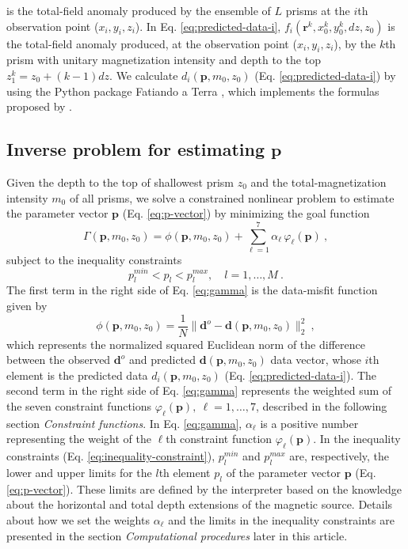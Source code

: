 is the total-field anomaly produced by the ensemble of $L$ prisms at the $i$th observation point ($x_{i}, y_{i}, z_{i}$). In Eq. \ref{eq:predicted-data-i}, $f_{i}(\mathbf{r}^{k}, x_{0}^{k}, y_{0}^{k}, dz, z_{0})$ is the total-field anomaly produced, at the observation point ($x_{i}, y_{i}, z_{i}$), by the $k$th prism with unitary magnetization intensity and depth to the top $z_{1}^{k} = z_{0} + (k-1)dz$. We calculate $d_{i} (\mathbf{p}, m_{0}, z_{0})$ (Eq. \ref{eq:predicted-data-i}) by using the Python package Fatiando a Terra \cite[]{uieda-etal2013}, which implements the formulas proposed by \cite{plouff1976}.

\subsection{Inverse problem for estimating $\mathbf{p}$}

Given the depth to the top of shallowest prism $z_{0}$ and the total-magnetization
intensity $m_{0}$ of all prisms, we solve a constrained nonlinear problem to estimate the parameter vector $\mathbf{p}$ (Eq. \ref{eq:p-vector}) by minimizing 
the goal function
\begin{equation}
\Gamma (\mathbf{p}, m_{0}, z_{0}) = \phi (\mathbf{p}, m_{0}, z_{0}) + 
\sum\limits^{7}_{\ell =1} \alpha_{\ell} \, \varphi_{\ell}(\mathbf{p}) \: ,
\label{eq:gamma}
\end{equation}
subject to the inequality constraints
\begin{equation}
p_{l}^{min} < p_{l} < p_{l}^{max}, \quad l = 1, \dots, M \: .
\label{eq:inequality-constraint}
\end{equation}
The first term in the right side of Eq. \ref{eq:gamma} is the data-misfit 
function given by
\begin{equation}\label{eq:misfit}
\phi (\mathbf{p}, m_{0}, z_{0}) = \frac{1}{N} \| \mathbf{d}^{o} - 
\mathbf{d}(\mathbf{p}, m_{0}, z_{0}) \|_{2}^{2} \: ,
\end{equation}
which represents the normalized squared Euclidean norm of the difference between the 
observed $\mathbf{d}^{o}$ and predicted $\mathbf{d}(\mathbf{p}, m_{0}, z_{0})$ data
vector, whose $i$th element is the predicted data $d_{i} (\mathbf{p}, m_{0}, z_{0})$ 
(Eq. \ref{eq:predicted-data-i}).
The second term in the right side of Eq. \ref{eq:gamma} represents the 
weighted sum of the seven constraint functions $\varphi_{\ell}(\mathbf{p}), \: 
\ell = 1, \dots, 7$, described in the following section \textit{Constraint functions}.
In Eq. \ref{eq:gamma}, $\alpha_{\ell}$ is a positive number representing 
the weight of the $\ell$th constraint function $\varphi_{\ell}(\mathbf{p})$.
In the inequality constraints (Eq. \ref{eq:inequality-constraint}), 
$p_{l}^{min}$ and $p_{l}^{max}$ are, respectively, the lower and upper limits for 
the $l$th element $p_{l}$ of the parameter vector $\mathbf{p}$ 
(Eq. \ref{eq:p-vector}). 
These limits are defined by the interpreter based on the knowledge about the 
horizontal and total depth extensions of the magnetic source. 
Details about how we set the weights $\alpha_{\ell}$ and the limits in the
inequality constraints are presented in the section 
\textit{Computational procedures} later in this article.

